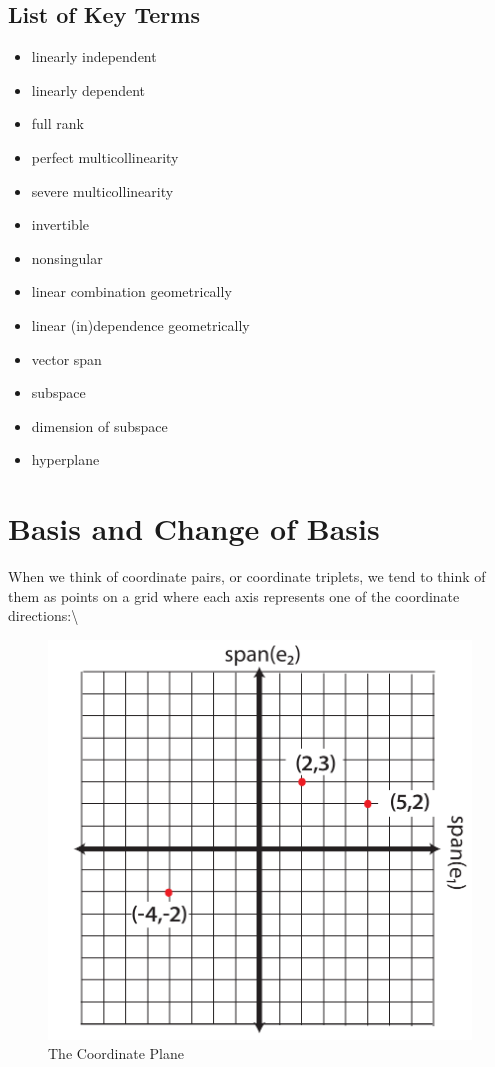 \documentclass[
]{article}
\providecommand{\tightlist}{%
  \setlength{\itemsep}{0pt}\setlength{\parskip}{0pt}}
\theoremstyle{definition}
\theoremstyle{definition}
\theoremstyle{definition}
\theoremstyle{definition}
\theoremstyle{remark}
\begin{document}
\hypertarget{list-of-key-terms-2}{%
\subsection*{List of Key Terms}\label{list-of-key-terms-2}}

\begin{itemize}
\tightlist
\item
  linearly independent
\item
  linearly dependent
\item
  full rank
\item
  perfect multicollinearity
\item
  severe multicollinearity
\item
  invertible
\item
  nonsingular
\item
  linear combination geometrically\\
\item
  linear (in)dependence geometrically\\
\item
  vector span\\
\item
  subspace\\
\item
  dimension of subspace\\
\item
  hyperplane
\end{itemize}

\hypertarget{basis}{%
\section{Basis and Change of Basis}\label{basis}}

When we think of coordinate pairs, or coordinate triplets, we tend to think of them as points on a grid where each axis represents one of the coordinate directions:\textbackslash{}

\begin{figure}

{\centering \includegraphics[width=0.4\linewidth]{figs/coordplane} 

}

\caption{The Coordinate Plane}\label{fig:unnamed-chunk-27}
\end{figure}
\end{document}

